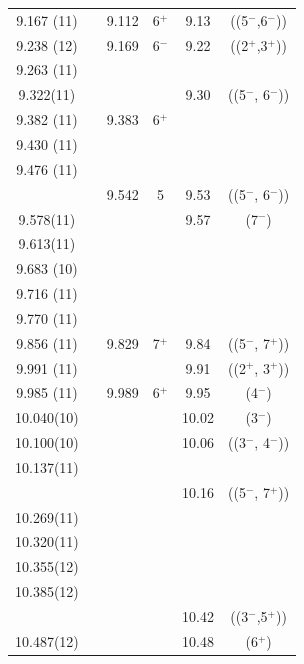 {\begin{center}
\begin{longtable}{cc cc cc}
  9.167 (11)    &   & 9.112 & 6$^+$ & 9.13  & ((5$^-$,6$^-$))           \\
  9.238 (12)    &   & 9.169 & 6$^-$ & 9.22  & ((2$^+$,3$^+$))           \\
  9.263 (11)    &   &   &   &   &                           \\
   9.322(11)    &   &   &   & 9.30  & ((5$^-$, 6$^-$))          \\
  9.382 (11)    &   & 9.383 & 6$^+$ &   &   \\
  9.430 (11)    &   &   &   &   &   \\
  9.476 (11)    &   &   &   &   &   \\
  &   & 9.542 & 5 & 9.53  & ((5$^-$, 6$^-$))        \\
   9.578(11)    &   &   &   & 9.57  & (7$^-$)                 \\
   9.613(11)    &   &   &   &   &                         \\
  9.683 (10)    &   &   &   &   &                         \\
  9.716 (11)    &   &   &   &   &                         \\
  9.770 (11)    &   &   &   &   &                         \\
  9.856 (11)    &   & 9.829 & 7$^+$ & 9.84  & ((5$^-$, 7$^+$))        \\
  9.991 (11)    &   &   &             & 9.91  & ((2$^+$, 3$^+$))        \\
  9.985 (11)    &   & 9.989 & 6$^+ $      & 9.95  & (4$^-$)                 \\
  10.040(10)    &   &   &   & 10.02 & (3$^-$)                 \\
  10.100(10)    &   &   &   & 10.06 & ((3$^-$, 4$^-$))        \\
  10.137(11)    &   &   &   &   &                         \\
  &   &   &   & 10.16 & ((5$^-$, 7$^+$))        \\
  10.269(11)    &   &   &   &   &                         \\
  10.320(11)    &   &   &   &   &                         \\
  10.355(12)    &   &   &   &   &                         \\
  10.385(12)    &   &   &   &   &                         \\
  &   &   &   & 10.42 & ((3$^-$,5$^+$))         \\
  10.487(12)    &   &   &   & 10.48 & (6$^+$)                 \\

\end{longtable}
\end{center}}
